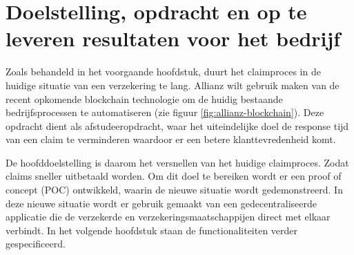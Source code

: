 \chapter{Doelstelling, opdracht en op te leveren resultaten voor het bedrijf}
Zoals behandeld in het voorgaande hoofdstuk, duurt het claimproces in de huidige situatie van een verzekering te lang. Allianz wilt gebruik maken van de recent opkomende blockchain technologie om de huidig bestaande bedrijfsprocessen te automatiseren (zie figuur \ref{fig:allianz-blockchain}). Deze opdracht dient als afstudeeropdracht, waar het uiteindelijke doel de response tijd van een claim te verminderen waardoor er een betere klanttevredenheid komt.\par

De hoofddoelstelling is daarom het versnellen van het huidige claimproces. Zodat claims sneller uitbetaald worden. Om dit doel te bereiken wordt er een proof of concept (POC) ontwikkeld, waarin de nieuwe situatie wordt gedemonstreerd. In deze nieuwe situatie wordt er gebruik gemaakt van een gedecentraliseerde applicatie die de verzekerde en verzekeringsmaatschappijen direct met elkaar verbindt. In het volgende hoofdstuk staan de functionaliteiten verder gespecificeerd.\par

